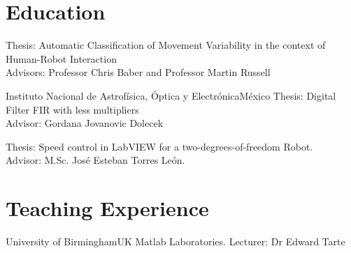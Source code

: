 \documentclass[10pt,a4paper,roman]{moderncv}
\begin{document}
\section{Education}
  {Thesis: Automatic Classification of Movement Variability in the context of Human-Robot Interaction
  \href{https://github.com/mxochicale/PhD}{\faGithubAlt}
   \\ Advisors: Professor Chris Baber and  Professor Martin Russell  }

  {Instituto Nacional de Astrof\'isica, \'Optica y Electr\'onica}{M\'exico}{}
  {Thesis: Digital Filter FIR with less multipliers
  \href{https://github.com/mxochicale/publications/blob/master/Thesis/M.Sc./doc/MPXochicale_MScThesis-2016.pdf}{\faFilePdfO}
  \href{https://github.com/mxochicale/publications/tree/master/Thesis/M.Sc.}{\faGithubAlt}
  \\ Advisor: Gordana Jovanovic Dolecek}

  {Thesis: Speed control in LabVIEW for a two-degrees-of-freedom Robot.
  \href{https://github.com/mxochicale/publications/blob/master/Thesis/B.Eng./doc/MPXochicale_BachelorEngThesis-2003.pdf}{\faFilePdfO}
  \href{https://github.com/mxochicale/publications/tree/master/Thesis/B.Eng.}{\faGithubAlt}
  \\ Advisor: M.Sc. Jos\'e Esteban Torres Le\'on.}


\nocite{*}





\section{Teaching Experience}
{University of Birmingham}{UK}{}
{Matlab Laboratories. Lecturer: Dr Edward Tarte }
\end{document}
